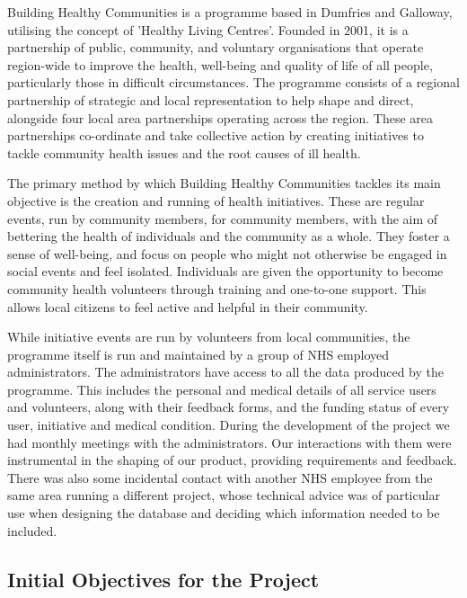 \documentclass{l3proj}
\begin{document}
Building Healthy Communities is a programme based in Dumfries and Galloway, utilising the concept of 'Healthy Living Centres'. Founded in 2001, it is a partnership of public, community, and voluntary organisations that operate region-wide to improve the health, well-being and quality of life of all people, particularly those in difficult circumstances. The programme consists of a regional partnership of strategic and local representation to help shape and direct, alongside four local area partnerships operating across the region. These area partnerships co-ordinate and take collective action by creating initiatives to tackle community health issues and the root causes of ill health.

The primary method by which Building Healthy Communities tackles its main objective is the creation and running of health initiatives. These are regular events, run by community members, for community members, with the aim of bettering the health of individuals and the community as a whole. They foster a sense of well-being, and focus on people who might not otherwise be engaged in social events and feel isolated. Individuals are given the opportunity to become community health volunteers through training and one-to-one support. This allows local citizens to feel active and helpful in their community.

While initiative events are run by volunteers from local communities, the programme itself is run and maintained by a group of NHS employed administrators. The administrators have access to all the data produced by the programme. This includes the personal and medical details of all service users and volunteers, along with their feedback forms, and the funding status of every user, initiative and medical condition. During the development of the project we had monthly meetings with the administrators. Our interactions with them were instrumental in the shaping of our product, providing requirements and feedback. There was also some incidental contact with another NHS employee from the same area running a different project, whose technical advice was of particular use when designing the database and deciding which information needed to be included.

\subsection{Initial Objectives for the Project}
\label{sec:initial-objectives}
\end{document}
